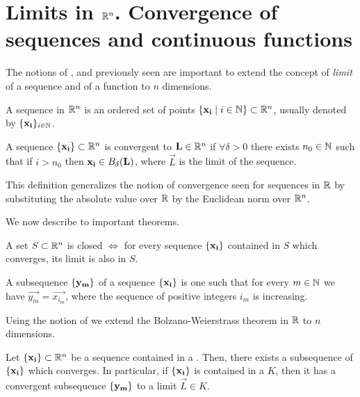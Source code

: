 \section{Limits in $\Rtn$. Convergence of sequences and continuous functions}

The notions of ,  and  previously seen are important 
to extend the concept of \textit{limit} of a sequence and of a function to $n$ dimensions.

\begin{defn}
    A sequence in $\Rtn$ is an ordered set of points $\set{\vec{x_i}\st i\in\N}\subset\Rtn$, usually denoted by 
    $\set{\vec{x_i}}_{i\in\N}$.
\end{defn}

\begin{defn}
    A sequence $\set{\vec{x_i}}\subset\Rtn$ is convergent to $\vec{L}\in\Rtn$ if $\forall\delta > 0$ there exists $n_0\in\N$
    such that if $i > n_0$ then $\vec{x_i}\in\oball{\delta}{\vec{L}}$, where $\vec{L}$ is the limit of the sequence.
\end{defn}

\begin{note}
    This definition generalizes the notion of convergence seen for sequences in $\R$ by substituting the absolute value 
    over $\R$ by the Euclidean norm over $\Rtn$.
\end{note}

We now describe to important theorems.

\begin{theorem}
    A set $S\subset\Rtn$ is closed $\iff$ for every sequence $\{ \mathbf{x_i} \}$ contained in $S$ which converges, its limit
    is also in $S$.
\end{theorem}

\begin{defn}\label{def:subsequence-rn}
    A subsequence $\{ \mathbf{y_m} \}$ of a sequence $\{ \mathbf{x_i} \}$ is one such that for every $m\in\N$ we have $\vec{y_m} =
    \vec{x_{i_m}}$, where the sequence of positive integers $i_m$ is increasing. 
\end{defn}

Using the notion of  we extend the Bolzano-Weierstrass theorem in $\R$ to $n$ dimensions.

\begin{theorem}
    Let $\set{\vec{x_i}}\subset\Rtn$ be a sequence contained in a . Then, there exists a subsequence
    of $\{ \mathbf{x_i} \}$ which converges. In particular, if $\{ \mathbf{x_i} \}$ is contained in a  $K$,
    then it has a convergent subsequence $\{ \mathbf{y_m} \}$ to a limit $\vec{L}\in K$.
\end{theorem}

